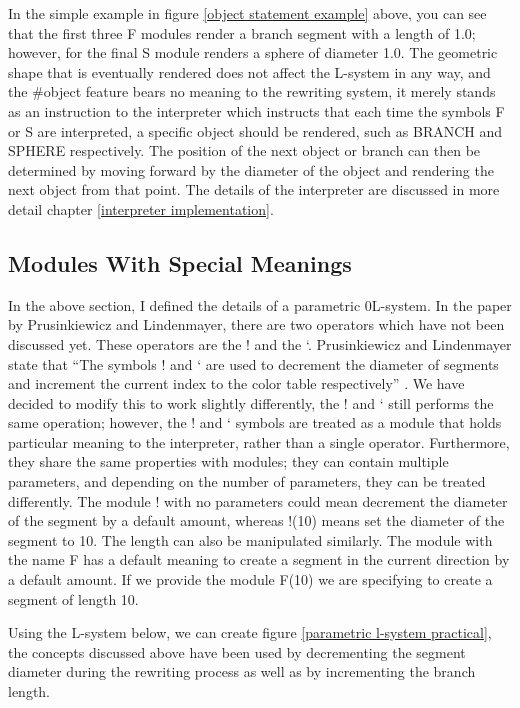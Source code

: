 \noindent
In the simple example in figure \ref{object statement example} above, you can see that the first three F modules render a branch segment with a length of 1.0; however, for the final S module renders a sphere of diameter 1.0. The geometric shape that is eventually rendered does not affect the L-system in any way, and the \#object feature bears no meaning to the rewriting system, it merely stands as an instruction to the interpreter which instructs that each time the symbols F or S are interpreted, a specific object should be rendered, such as BRANCH and SPHERE respectively. The position of the next object or branch can then be determined by moving forward by the diameter of the object and rendering the next object from that point. The details of the interpreter are discussed in more detail chapter \ref{interpreter implementation}.

\subsection{Modules With Special Meanings}

In the above section, I defined the details of a parametric 0L-system. In the paper by Prusinkiewicz and Lindenmayer, there are two operators which have not been discussed yet. These operators are the ! and the ‘. Prusinkiewicz and Lindenmayer state that “The symbols ! and ‘ are used to decrement the diameter of segments and increment the current index to the color table respectively” \cite{prusinkiewicz2012algorithmic}. We have decided to modify this to work slightly differently, the ! and ‘ still performs the same operation; however, the ! and ‘ symbols are treated as a module that holds particular meaning to the interpreter, rather than a single operator. Furthermore, they share the same properties with modules; they can contain multiple parameters, and depending on the number of parameters, they can be treated differently. The module ! with no parameters could mean decrement the diameter of the segment by a default amount, whereas !(10) means set the diameter of the segment to 10. The length can also be manipulated similarly. The module with the name F has a default meaning to create a segment in the current direction by a default amount. If we provide the module F(10) we are specifying to create a segment of length 10.

Using the L-system below, we can create figure \ref{parametric l-system practical}, the concepts discussed above have been used by decrementing the segment diameter during the rewriting process as well as by incrementing the branch length.

